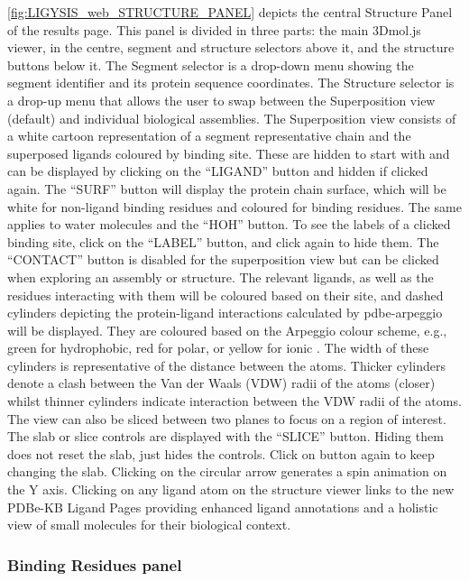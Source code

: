 \autoref{fig:LIGYSIS_web_STRUCTURE_PANEL} depicts the central Structure Panel of the results page. This panel is divided in three parts: the main 3Dmol.js viewer, in the centre, segment and structure selectors above it, and the structure buttons below it. The Segment selector  is a drop-down menu showing the segment identifier and its protein sequence coordinates. The Structure selector is a drop-up menu that allows the user to swap between the Superposition view (default) and individual biological assemblies. The Superposition view consists of a white cartoon representation of a segment representative chain and the superposed ligands coloured by binding site. These are hidden to start with and can be displayed by clicking on the ``LIGAND'' button and hidden if clicked again. The ``SURF'' button will display the protein chain surface, which will be white for non-ligand binding residues and coloured for binding residues. The same applies to water molecules and the ``HOH'' button. To see the labels of a clicked binding site, click on the ``LABEL'' button, and click again to hide them. The ``CONTACT'' button is disabled for the superposition view but can be clicked when exploring an assembly or structure. The relevant ligands, as well as the residues interacting with them will be coloured based on their site, and dashed cylinders depicting the protein-ligand interactions calculated by pdbe-arpeggio will be displayed. They are coloured based on the Arpeggio colour scheme, e.g., green for hydrophobic, red for polar, or yellow for ionic \cite{JUBB_2017_ARPEGGIO}. The width of these cylinders is representative of the distance between the atoms. Thicker cylinders denote a clash between the Van der Waals (VDW) radii of the atoms (closer) whilst thinner cylinders indicate interaction between the VDW radii of the atoms. The view can also be sliced between two planes to focus on a region of interest. The slab or slice controls are displayed with the ``SLICE'' button. Hiding them does not reset the slab, just hides the controls. Click on button again to keep changing the slab. Clicking on the circular arrow generates a spin animation on the Y axis. Clicking on any ligand atom on the structure viewer links to the new PDBe-KB Ligand Pages \cite{CHOUDHARY_2024_PDBETOOLS} providing enhanced ligand annotations and a holistic view of small molecules for their biological context.

\subsubsection{Binding Residues panel}

